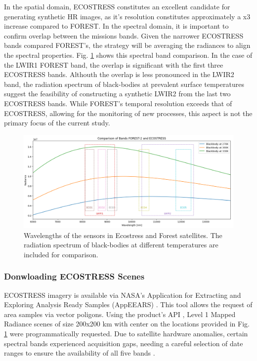         In the spatial domain, ECOSTRESS constitutes an excellent candidate for generating synthetic HR images, as it's resolution constitutes approximately a x3 increase compared to FOREST. In the spectral domain, it is important to confirm overlap between the missions bands. Given the narrower ECOSTRESS bands compared FOREST's, the strategy will be averaging the radiances to align the spectral properties. Fig. \ref{fig:5-wavelength-comparison} shows this spectral band comparison. In the case of the LWIR1 FOREST band, the overlap is significant with the first three ECOSTRESS bands. Althouth the overlap is less pronounced in the LWIR2 band, the radiation spectrum of black-bodies at prevalent surface temperatures suggest the feasibility of constructing a synthetic LWIR2 from the last two ECOSTRESS bands. While FOREST's temporal resolution exceeds that of ECOSTRESS, allowing for the monitoring of new processes, this aspect is not the primary focus of the current study.
    

        \begin{figure}[ht!]
            \centering
            \includegraphics[width=\linewidth]{Includes/5-wavelength-comparison.png}
            \caption{Wavelengths of the sensors in Ecostress and Forest satellites. The radiation spectrum of black-bodies at different temperatures are included for comparison.}
            \label{fig:5-wavelength-comparison}
        \end{figure}

        \subsubsection{Donwloading ECOSTRESS Scenes}
            ECOSTRESS imagery is available via NASA's Application for Extracting and Exploring Analysis Ready Samples (AppEEARS) \cite{AppEEARS2023}. This tool allows the request of area samples via vector poligons. Using the product's API \cite{AppEEARSAPI2023}, Level 1 Mapped Radiance scenes of size 200x200 km  with center on the locations provided in Fig. \ref{fig:5-wavelength-comparison} were programmatically requested. Due to satellite hardware anomalies, certain spectral bands experienced acquisition gaps, needing a careful selection of date ranges to ensure the availability of all five bands \cite{ECO1BMAPRAD2023}.
    
